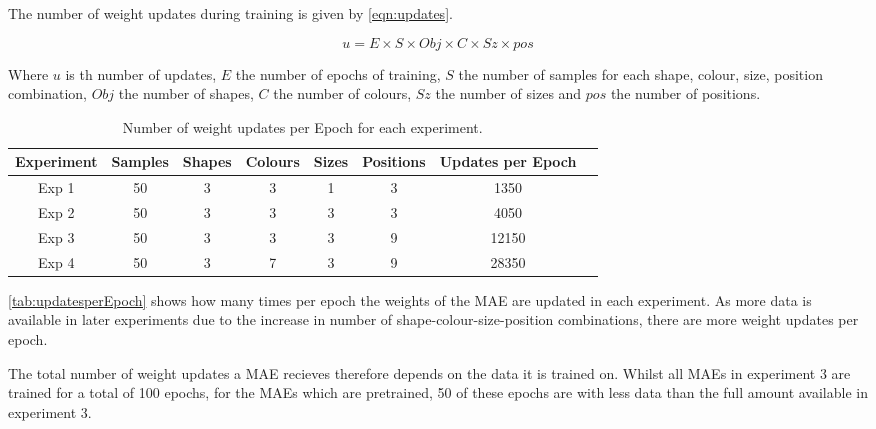 The number of weight updates during training is given by \autoref{eqn:updates}.

\begin{equation}\label{eqn:updates}
u = E \times S \times Obj \times C \times Sz \times pos
\end{equation}

Where $u$ is th number of updates, $E$ the number of epochs of training, $S$ the number of samples for each shape, colour, size, position combination, $Obj$ the number of shapes, $C$ the number of colours, $Sz$ the number of sizes and $pos$ the number of positions.


\begin{table}
\centering
\begin{tabular}{|c|c|c|c|c|c|c|c|}
\hline
Experiment & Samples & Shapes & Colours & Sizes & Positions & Updates per Epoch \\ \hline
Exp 1 & 50 & 3 & 3 & 1 & 3 & 1350 \\ \hline
Exp 2 & 50 & 3 & 3 & 3 & 3 & 4050 \\ \hline
Exp 3 & 50 & 3 & 3 & 3 & 9 & 12150 \\ \hline
Exp 4 & 50 & 3 & 7 & 3 & 9 & 28350 \\ \hline

\end{tabular}
\caption{Number of weight updates per Epoch for each experiment.}
\label{tab:updatesperEpoch}
\end{table}

\autoref{tab:updatesperEpoch} shows how many times per epoch the weights of the MAE are updated in each experiment. As more data is available in later experiments due to the increase in number of shape-colour-size-position combinations, there are more weight updates per epoch. 

The total number of weight updates a MAE recieves therefore depends on the data it is trained on. Whilst all MAEs in experiment 3 are trained for a total of 100 epochs, for the MAEs which are pretrained, 50 of these epochs are with less data than the full amount available in experiment 3.


